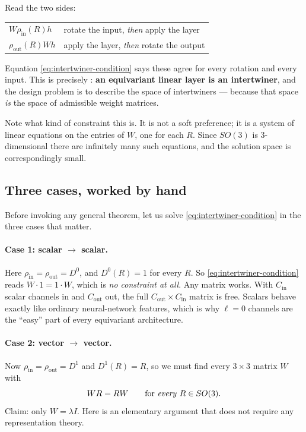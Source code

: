 \documentclass[11pt,a4paper]{report}
\theoremstyle{definition}
\theoremstyle{remark}
\begin{document}
Read the two sides:
\begin{center}
\begin{tabular}{ll}
$W\rho_{\mathrm{in}}(R)h$ & rotate the input, \emph{then} apply the layer \\
$\rho_{\mathrm{out}}(R)Wh$ & apply the layer, \emph{then} rotate the output \\
\end{tabular}
\end{center}
Equation \eqref{eq:intertwiner-condition} says these agree for every
rotation and every input. This is precisely
: \textbf{an equivariant linear layer is an
intertwiner}, and the design problem is to describe the space of
intertwiners --- because that space \emph{is} the space of admissible
weight matrices.

Note what kind of constraint this is. It is not a soft preference; it is a
system of linear equations on the entries of $W$, one for each $R$. Since
$SO(3)$ is $3$-dimensional there are infinitely many such equations, and the
solution space is correspondingly small.

\subsection{Three cases, worked by hand}
\label{sec:schur-by-hand}

Before invoking any general theorem, let us solve
\eqref{eq:intertwiner-condition} in the three cases that matter.

\paragraph{Case 1: scalar $\to$ scalar.} Here
$\rho_{\mathrm{in}}=\rho_{\mathrm{out}}=D^0$, and $D^0(R)=1$ for every $R$.
So \eqref{eq:intertwiner-condition} reads $W\cdot1=1\cdot W$, which is
\emph{no constraint at all}. Any matrix works. With $C_{\mathrm{in}}$ scalar
channels in and $C_{\mathrm{out}}$ out, the full
$C_{\mathrm{out}}\times C_{\mathrm{in}}$ matrix is free. Scalars behave
exactly like ordinary neural-network features, which is why $\ell=0$
channels are the ``easy'' part of every equivariant architecture.

\paragraph{Case 2: vector $\to$ vector.} Now $\rho_{\mathrm{in}}=\rho_{\mathrm{out}}=D^1$
and $D^1(R)=R$, so we must find every $3\times3$ matrix $W$ with
\[
WR=RW\qquad\text{for \emph{every} } R\in SO(3) .
\]
Claim: only $W=\lambda I$. Here is an elementary argument that does not
require any representation theory.
\end{document}
